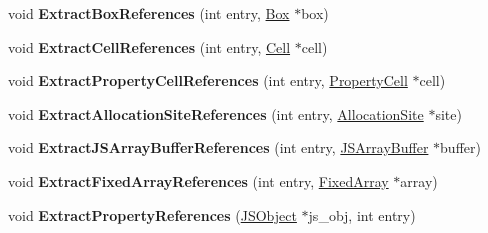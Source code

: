 \begin{DoxyCompactItemize}
\item 
void {\bfseries Extract\+Box\+References} (int entry, \hyperlink{classv8_1_1internal_1_1_box}{Box} $\ast$box)\hypertarget{classv8_1_1internal_1_1_v8_heap_explorer_a123ef41be6fa931eee2654457833cddc}{}\label{classv8_1_1internal_1_1_v8_heap_explorer_a123ef41be6fa931eee2654457833cddc}

\item 
void {\bfseries Extract\+Cell\+References} (int entry, \hyperlink{classv8_1_1internal_1_1_cell}{Cell} $\ast$cell)\hypertarget{classv8_1_1internal_1_1_v8_heap_explorer_a7fc62ef085a2aae025c1fbedaff976af}{}\label{classv8_1_1internal_1_1_v8_heap_explorer_a7fc62ef085a2aae025c1fbedaff976af}

\item 
void {\bfseries Extract\+Property\+Cell\+References} (int entry, \hyperlink{classv8_1_1internal_1_1_property_cell}{Property\+Cell} $\ast$cell)\hypertarget{classv8_1_1internal_1_1_v8_heap_explorer_ad923dbb390d66ac761d352a08cadc4fa}{}\label{classv8_1_1internal_1_1_v8_heap_explorer_ad923dbb390d66ac761d352a08cadc4fa}

\item 
void {\bfseries Extract\+Allocation\+Site\+References} (int entry, \hyperlink{classv8_1_1internal_1_1_allocation_site}{Allocation\+Site} $\ast$site)\hypertarget{classv8_1_1internal_1_1_v8_heap_explorer_ab4f0dfe3e5411f71faeef122e2bc2fe8}{}\label{classv8_1_1internal_1_1_v8_heap_explorer_ab4f0dfe3e5411f71faeef122e2bc2fe8}

\item 
void {\bfseries Extract\+J\+S\+Array\+Buffer\+References} (int entry, \hyperlink{classv8_1_1internal_1_1_j_s_array_buffer}{J\+S\+Array\+Buffer} $\ast$buffer)\hypertarget{classv8_1_1internal_1_1_v8_heap_explorer_a691d1b84a3f62506e77cca743a0e65ec}{}\label{classv8_1_1internal_1_1_v8_heap_explorer_a691d1b84a3f62506e77cca743a0e65ec}

\item 
void {\bfseries Extract\+Fixed\+Array\+References} (int entry, \hyperlink{classv8_1_1internal_1_1_fixed_array}{Fixed\+Array} $\ast$array)\hypertarget{classv8_1_1internal_1_1_v8_heap_explorer_a0a4f4ee4616cdce261f78547c5089f7c}{}\label{classv8_1_1internal_1_1_v8_heap_explorer_a0a4f4ee4616cdce261f78547c5089f7c}

\item 
void {\bfseries Extract\+Property\+References} (\hyperlink{classv8_1_1internal_1_1_j_s_object}{J\+S\+Object} $\ast$js\+\_\+obj, int entry)\hypertarget{classv8_1_1internal_1_1_v8_heap_explorer_adf7719b031b8e9fecc590419b7829ab6}{}\label{classv8_1_1internal_1_1_v8_heap_explorer_adf7719b031b8e9fecc590419b7829ab6}


\end{DoxyCompactItemize}

